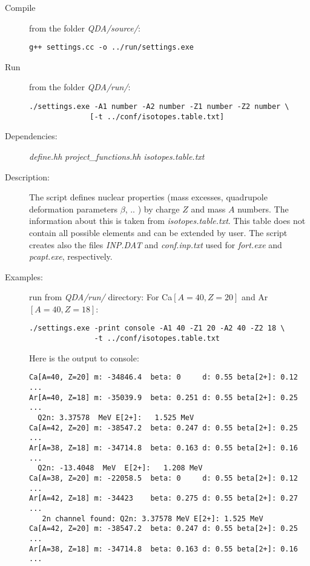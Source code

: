\documentclass[preprint,review,12pt]{elsarticle}
\begin{document}
    \begin{description}
       \item[Compile]  from the folder \textit{QDA/source/}:
        \begin{verbatim}
g++ settings.cc -o ../run/settings.exe
        \end{verbatim}
       \item[Run] from the folder \textit{QDA/run/}:
        \begin{verbatim}
./settings.exe -A1 number -A2 number -Z1 number -Z2 number \
              [-t ../conf/isotopes.table.txt]
        \end{verbatim}

       \item[Dependencies:]
           \subitem   \textit{define.hh }
           \subitem   \textit{project\_functions.hh}
           \subitem   \textit{isotopes.table.txt }

       \item[Description:] The script defines nuclear properties (mass excesses, quadrupole deformation parameters $\beta$, .. ) by charge $Z$ and mass $A$ numbers. The information about this is taken from \textit{isotopes.table.txt}. This table does not contain all possible elements and can be
           extended by user. The script creates also the files \textit{INP.DAT} and \textit{conf.inp.txt} used for \textit{fort.exe}  and \textit{pcapt.exe}, respectively.

       \item [Examples:] run from \textit{QDA/run/} directory:
        \subitem For Ca$[A=40, Z=20]$ and Ar$[A=40, Z=18]$:
    \begin{verbatim}
./settings.exe -print console -A1 40 -Z1 20 -A2 40 -Z2 18 \
               -t ../conf/isotopes.table.txt
    \end{verbatim}
Here is the output to console:
\begin{verbatim}
Ca[A=40, Z=20] m: -34846.4  beta: 0     d: 0.55 beta[2+]: 0.12 ...
Ar[A=40, Z=18] m: -35039.9  beta: 0.251 d: 0.55 beta[2+]: 0.25 ...
  Q2n: 3.37578  MeV E[2+]:   1.525 MeV
Ca[A=42, Z=20] m: -38547.2  beta: 0.247 d: 0.55 beta[2+]: 0.25 ...
Ar[A=38, Z=18] m: -34714.8  beta: 0.163 d: 0.55 beta[2+]: 0.16 ...
  Q2n: -13.4048  MeV  E[2+]:   1.208 MeV
Ca[A=38, Z=20] m: -22058.5  beta: 0     d: 0.55 beta[2+]: 0.12 ...
Ar[A=42, Z=18] m: -34423    beta: 0.275 d: 0.55 beta[2+]: 0.27 ...
   2n channel found: Q2n: 3.37578 MeV E[2+]: 1.525 MeV
Ca[A=42, Z=20] m: -38547.2  beta: 0.247 d: 0.55 beta[2+]: 0.25 ...
Ar[A=38, Z=18] m: -34714.8  beta: 0.163 d: 0.55 beta[2+]: 0.16 ...
\end{verbatim}


\end{description}
\end{document}
